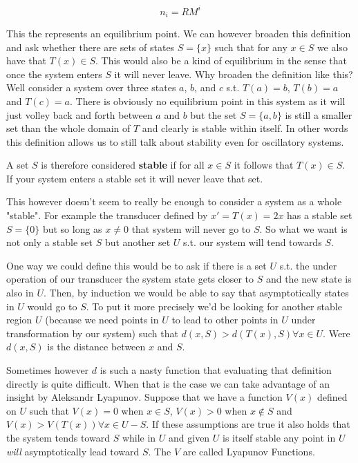 \documentclass[11pt,a5paper]{article}
\begin{document}
$$n_i=RM^i$$

This the represents an equilibrium point. We can however broaden this definition and ask whether there are sets of states $S=\{x\}$ such that for any $x\in S$ we also have that $T(x)\in S$. This would also be a kind of equilibrium in the sense that once the system enters $S$ it will never leave. Why broaden the definition like this? Well consider a system over three states $a$, $b$, and $c$ s.t. $T(a)=b$, $T(b)=a$ and $T(c)=a$. There is obviously no equilibrium point in this system as it will just volley back and forth between $a$ and $b$ but the set $S=\{a,b\}$ is still a smaller set than the whole domain of $T$ and clearly is stable within itself. In other words this definition allows us to still talk about stability even for oscillatory systems. 

A set $S$ is therefore considered \textbf{stable} if for all $x\in S$ it follows that $T(x)\in S$. If your system enters a stable set it will never leave that set. \newline

This however doesn't seem to really be enough to consider a system as a whole "stable". For example the transducer defined by $x'=T(x)=2x$ has a stable set $S=\{0\}$ but so long as $x\neq 0$ that system will never go to $S$. So what we want is not only a stable set $S$ but another set $U$ s.t. our system will tend towards $S$. 

One way we could define this would be to ask if there is a set $U$ s.t. the under operation of our transducer the system state gets closer to $S$ and the new state is also in $U$. Then, by induction we would be able to say that asymptotically states in $U$ would go to $S$. To put it more precisely we'd be looking for another stable region $U$ (because we need points in $U$ to lead to other points in $U$ under transformation by our system) such that $d(x, S) > d(T(x), S) \forall x \in U$. Were $d(x, S)$ is the distance between $x$ and $S$. 

Sometimes however $d$ is such a nasty function that evaluating that definition directly is quite difficult. When that is the case we can take advantage of an insight by Aleksandr Lyapunov\cite{stability}. Suppose that we have a function $V(x)$ defined on $U$ such that $V(x)=0$ when $x\in S$, $V(x)>0$ when $x\notin S$ and $V(x) > V(T(x)) \forall x\in U - S$. If these assumptions are true it also holds that the system tends toward $S$ while in $U$ and given $U$ is itself stable any point in $U$ \textit{will} asymptotically lead toward $S$. The $V$ are called Lyapunov Functions. 
\end{document}
